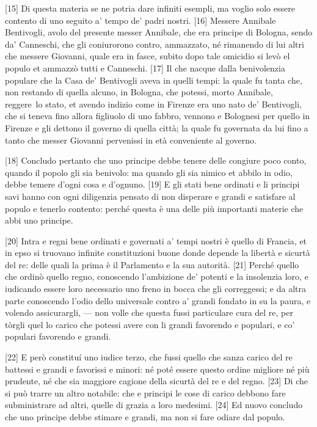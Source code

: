 {[}15{]} Di questa materia se ne potria dare infiniti esempli, ma voglio
solo essere contento di uno seguito a' tempo de' padri nostri. {[}16{]}
Messere Annibale Bentivogli, avolo del presente messer Annibale, che era
principe di Bologna, sendo da' Canneschi, che gli coniurorono contro,
ammazzato, né rimanendo di lui altri che messere Giovanni, quale era in
fasce, subito dopo tale omicidio si levò el populo et ammazzò tutti e
Canneschi. {[}17{]} Il che nacque dalla benivolenzia populare che la
Casa de' Bentivogli aveva in quelli tempi: la quale fu tanta che, non
restando di quella alcuno, in Bologna, che potessi, morto Annibale,
reggere\est\ lo stato, et avendo indizio come in Firenze era uno nato de'
Bentivogli, che si teneva fino allora figliuolo di uno fabbro, vennono e
Bolognesi per quello in Firenze e gli dettono il governo di quella
città; la quale fu governata da lui fino a tanto che messer Giovanni
pervenissi in età conveniente al governo.

{[}18{]} Concludo pertanto che uno principe debbe tenere delle congiure
poco conto, quando il popolo gli sia benivolo: ma quando gli sia nimico
et abbilo in odio, debbe temere d'ogni cosa e d'ognuno. {[}19{]} E gli
stati bene ordinati e li principi savi hanno con ogni diligenzia pensato
di non disperare e grandi e satisfare al populo e tenerlo contento:
perché questa è una delle più importanti materie che abbi uno principe.

{[}20{]} Intra e regni bene ordinati e governati a' tempi nostri è
quello di Francia, et in epso si truovano infinite constituzioni buone
donde depende la libertà e sicurtà del re: delle quali la prima è il
Parlamento e la sua autorità. {[}21{]} Perché quello che ordinò quello
regno, conoscendo l'ambizione de' potenti e la insolenzia loro, e
iudicando essere loro necessario uno freno in bocca che gli correggessi;
e da altra parte conoscendo l'odio dello universale contro a' grandi
fondato in su la paura, e volendo assicurargli, --- non volle che questa
fussi particulare cura del re, per tòrgli quel lo carico che potessi
avere con li grandi favorendo e populari, e co' populari favorendo e
grandi.

\pagebreak

{[}22{]} E però constituí uno iudice terzo, che fussi quello che sanza
carico del re battessi e grandi e favorissi e minori:
né poté essere
questo ordine migliore né più prudente, né che sia maggiore cagione
della sicurtà del re e del regno. {[}23{]} Di che si può trarre un altro
notabile: che e principi le cose di carico debbono fare subministrare ad
altri, quelle di grazia a loro medesimi. {[}24{]} Ed nuovo concludo che
uno principe debbe stimare e grandi, ma non si fare odiare dal populo.

